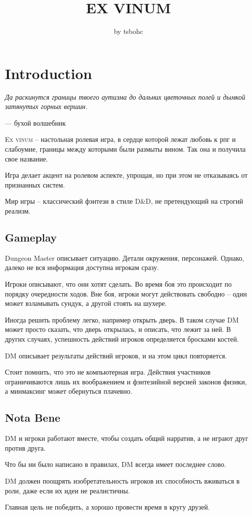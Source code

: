 \documentclass[a5paper,11pt]{book}
\title{\textbf{EX VINUM}}
\author{by tsbohc}
\date{}
\begin{document}
\maketitle
\tableofcontents
\pagebreak


\chapter{Introduction}
\begin{multicols}{2}
\epigraph{\emph{Да раскинутся границы твоего аутизма до дальних цветочных полей и дымкой затянутых горных вершин.}}{--- бухой волшебник}

\lettrine{E}{x vinum} -- настольная ролевая игра, в сердце которой лежат любовь к рпг и слабоумие, границы между которыми были размыты вином. Так она и получила свое название.

Игра делает акцент на ролевом аспекте, упрощая, но при этом не отказываясь от признанных систем.

Мир игры -- классический фэнтези в стиле D\&D, не претендующий на строгий реализм.

\section{Gameplay}
Dungeon Master описывает ситуацию. Детали окружения, персонажей. Однако, далеко не вся информация доступна игрокам сразу.

Игроки описывают, что они хотят сделать. Во время боя это происходит по порядку очередности ходов. Вне боя, игроки могут действовать свободно -- один может взламывать сундук, а другой стоять на шухере.

Иногда решить проблему легко, например открыть дверь. В таком случае DM может просто сказать, что дверь открылась, и описать, что лежит за ней. В других случаях, успешность действий игроков определяется бросками костей.

DM описывает результаты действий игроков, и на этом цикл повторяется.

Стоит помнить, что это не компьютерная игра. Действия участников ограничиваются лишь их воображением и фэнтезийной версией законов физики, а минмаксинг может обернуться плачевно.

\section{Nota Bene}
DM и игроки работают вместе, чтобы создать общий нарратив, а не играют друг против друга.

Что бы ни было написано в правилах, DM всегда имеет последнее слово.

DM должен поощрять изобретательность игроков их способность вживаться в роли, даже если их идеи не реалистичны.

Главная цель не победить, а хорошо провести время в кругу друзей.


\end{multicols}
\end{document}
